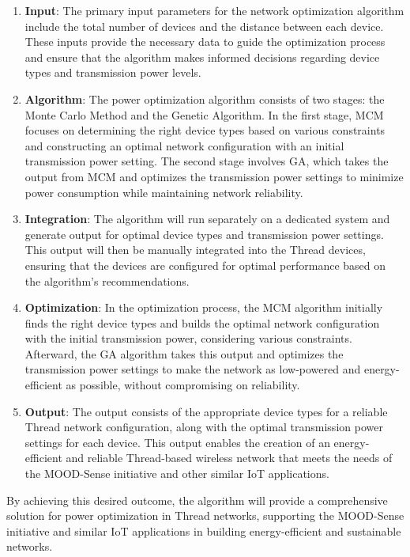 \begin{enumerate}
    \item \textbf{Input}: The primary input parameters for the network optimization algorithm include the total number of devices and the distance between each device. These inputs provide the necessary data to guide the optimization process and ensure that the algorithm makes informed decisions regarding device types and transmission power levels.
    \item \textbf{Algorithm}: The power optimization algorithm consists of two stages: the Monte Carlo Method and the Genetic Algorithm. In the first stage, MCM focuses on determining the right device types based on various constraints and constructing an optimal network configuration with an initial transmission power setting. The second stage involves GA, which takes the output from MCM and optimizes the transmission power settings to minimize power consumption while maintaining network reliability.
    \item \textbf{Integration}: The algorithm will run separately on a dedicated system and generate output for optimal device types and transmission power settings. This output will then be manually integrated into the Thread devices, ensuring that the devices are configured for optimal performance based on the algorithm's recommendations.
    \item \textbf{Optimization}: In the optimization process, the MCM algorithm initially finds the right device types and builds the optimal network configuration with the initial transmission power, considering various constraints. Afterward, the GA algorithm takes this output and optimizes the transmission power settings to make the network as low-powered and energy-efficient as possible, without compromising on reliability.
    \item \textbf{Output}: The output consists of the appropriate device types for a reliable Thread network configuration, along with the optimal transmission power settings for each device. This output enables the creation of an energy-efficient and reliable Thread-based wireless network that meets the needs of the MOOD-Sense initiative and other similar IoT applications.
\end{enumerate}

By achieving this desired outcome, the algorithm will provide a comprehensive solution for power optimization in Thread networks, supporting the MOOD-Sense initiative and similar IoT applications in building energy-efficient and sustainable networks.


